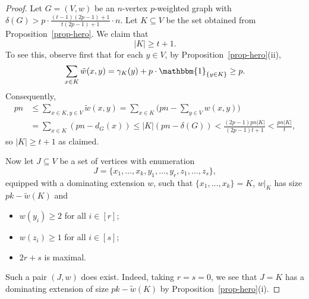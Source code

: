\documentclass[11pt, a4paper]{article}
\theoremstyle{definition}
\newcommand{\cG}{\mathcal{G}}
\begin{document}
\begin{proof}
	Let $G=(V,w)$ be an $n$-vertex $p$-weighted graph with $\delta(G)>p\cdot\frac{(t-1)(2p-1)+1}{t(2p-1)+1}\cdot n$.	%
	Let $K \subseteq V$ be the set obtained from Proposition~\ref{prop-hero}. We claim that
	\begin{equation}\label{eq-K}
		|K|\ge t+1.
	\end{equation}
	To see this, observe first that for each $y\in V$, by Proposition~\ref{prop-hero}(ii), 
	$$\sum_{x \in K}\tilde{w}(x,y)=\gamma_K(y)+p\cdot\mathbbm{1}_{\{y\in K\}}\ge p.$$
	Consequently,
	\begin{align}
		pn &\leq \sum_{x \in K,y \in V}\tilde{w}(x,y) =\sum_{x \in K}\Big(pn-\sum_{y\in V}w(x,y)\Big)\nonumber\\
		&=\sum_{x \in K}(pn-d_G(x)) \leq |K|(pn-\delta(G)) < \frac{(2p-1)pn|K|}{(2p-1)t+1} < \frac{pn|K|}{t},\label{eq:ricecake}
	\end{align}
	so $|K| \geq t+1$ as claimed.
	
	Now let $J \subseteq V$ be a set of vertices with enumeration 
	$$J = \lbrace x_1,\ldots,x_k,y_1,\ldots,y_r,z_1,\ldots,z_s\rbrace,$$
	equipped with a dominating extension $w$, such that $\lbrace x_1,\ldots,x_k\rbrace = K$, $w|_K$ has size $pk-\tilde{w}(K)$ and 
	\begin{itemize}
		\item  $w(y_i) \geq 2$ for all $i \in [r]$;
		\item  $w(z_i) \geq 1$ for all $i \in [s]$;
		\item $2r+s$ is maximal.
	\end{itemize}
	Such a pair $(J,w)$ does exist. Indeed, taking $r=s=0$, we see that $J=K$ has a dominating extension of size $pk-\tilde{w}(K)$ by Proposition~\ref{prop-hero}(i).
	

\end{proof}
\end{document}
